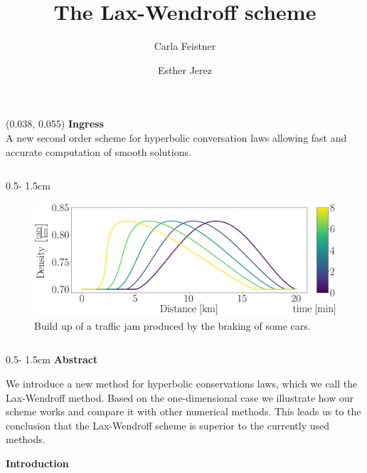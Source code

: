 \documentclass{uibposter}
\title{The Lax-Wendroff scheme}
\author
{%
    Carla Feistner 
    \and
    Esther Jerez
}
\institute
{
    Department of mathematics -- University of Bergen
}
\begin{document}
\begin{textblock}{0.5}(0.038, 0.055)
    \color{white}
    \sffamily
    \textbf{Ingress}
    \\
A new second order scheme for hyperbolic conversation laws allowing fast and accurate computation of smooth solutions. 
\end{textblock}

\begin{frame}[fragile]

\begin{columns}
\begin{column}{0.5\textwidth - 1.5cm}
    \begin{figure}[h]
    \includegraphics[width=\textwidth]{fig/traffic_motivation_laxW_continous.png} \caption{Build up of a traffic jam produced by the braking of some cars.} \label{img:traffic_flow_motivation}	
    \end{figure}
    \vspace{0.5cm}

\begin{column}{0.5\textwidth - 1.5cm}
\textbf{Abstract}
\vspace{0.5cm}

{\fontsize{40}{15}\selectfont
	We introduce a new method for hyperbolic conservations laws, which we call the Lax-Wendroff method. Based on the one-dimensional case we illustrate how our scheme works and compare it with other numerical methods. This leads us to the conclusion that the Lax-Wendroff scheme is superior to the currently used methods.}

\vspace{0.5cm}
\textbf{Introduction}
\vspace{0.5cm}


\end{column}
\end{column}
\end{columns}
\end{frame}
\end{document}
